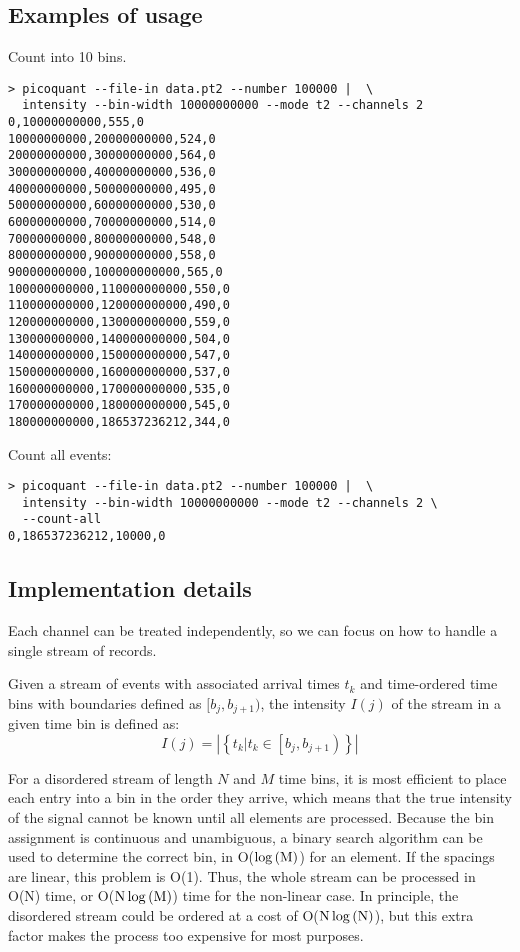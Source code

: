 \documentclass{article}
\newcommand{\braces}[1]{\ensuremath{\left\lbrace #1 \right\rbrace}}
\begin{document}
\subsection{Examples of usage}
Count into 10\milli\second{} bins.
\begin{verbatim}
> picoquant --file-in data.pt2 --number 100000 |  \
  intensity --bin-width 10000000000 --mode t2 --channels 2 
0,10000000000,555,0
10000000000,20000000000,524,0
20000000000,30000000000,564,0
30000000000,40000000000,536,0
40000000000,50000000000,495,0
50000000000,60000000000,530,0
60000000000,70000000000,514,0
70000000000,80000000000,548,0
80000000000,90000000000,558,0
90000000000,100000000000,565,0
100000000000,110000000000,550,0
110000000000,120000000000,490,0
120000000000,130000000000,559,0
130000000000,140000000000,504,0
140000000000,150000000000,547,0
150000000000,160000000000,537,0
160000000000,170000000000,535,0
170000000000,180000000000,545,0
180000000000,186537236212,344,0
\end{verbatim}
Count all events:
\begin{verbatim}
> picoquant --file-in data.pt2 --number 100000 |  \
  intensity --bin-width 10000000000 --mode t2 --channels 2 \
  --count-all
0,186537236212,10000,0
\end{verbatim}

\subsection{Implementation details}
\label{sec:intensity_implementation}
Each channel can be treated independently, so we can focus on how to handle a single stream of records. 

Given a stream of events with associated arrival times $t_{k}$ and time-ordered time bins with boundaries defined as $[b_{j}, b_{j+1})$, the intensity $I(j)$ of the stream in a given time bin is defined as:
\begin{equation}
I(j) = \left| \braces{t_{k} | t_{k} \in \left[b_{j}, b_{j+1}\right)} \right|
\end{equation}

For a disordered stream of length $N$ and $M$ time bins, it is most efficient to place each entry into a bin in the order they arrive, which means that the true intensity of the signal cannot be known until all elements are processed. Because the bin assignment is continuous and unambiguous, a binary search algorithm can be used to determine the correct bin, in O($\log{(\textnormal{M})}$) for an element. If the spacings are linear, this problem is O(1). Thus, the whole stream can be processed in O(N) time, or O($\textnormal{N}\log{(\textnormal{M})}$) time for the non-linear case. In principle, the disordered stream could be ordered at a cost of O($\textnormal{N}\log{(\textnormal{N})}$), but this extra factor makes the process too expensive for most purposes.
\end{document}
